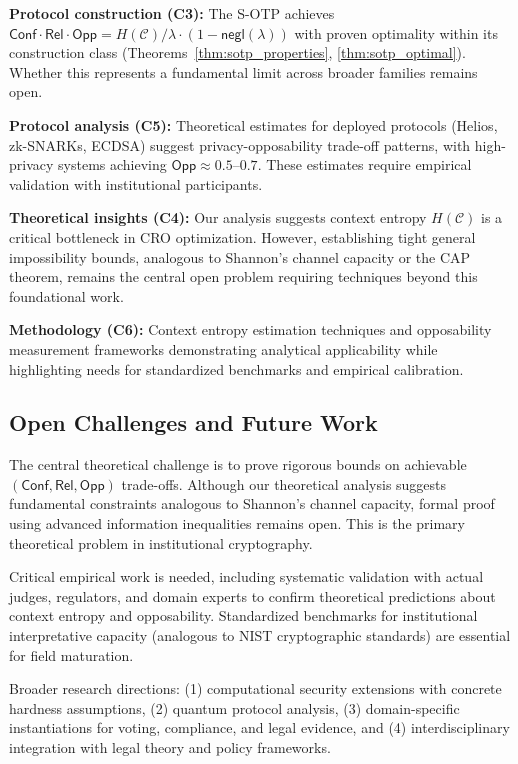 \documentclass{ieeeaccess}
\begin{document}
\textbf{Protocol construction (C3):} The S-OTP achieves $\mathsf{Conf} \cdot \mathsf{Rel} \cdot \mathsf{Opp} = H(\mathcal{C})/\lambda \cdot (1-\mathsf{negl}(\lambda))$ with proven optimality within its construction class (Theorems~\ref{thm:sotp_properties}, \ref{thm:sotp_optimal}). Whether this represents a fundamental limit across broader families remains open.

\textbf{Protocol analysis (C5):} Theoretical estimates for deployed protocols (Helios, zk-SNARKs, ECDSA) suggest privacy-opposability trade-off patterns, with high-privacy systems achieving $\mathsf{Opp} \approx 0.5\text{--}0.7$. These estimates require empirical validation with institutional participants.

\textbf{Theoretical insights (C4):} Our analysis suggests context entropy $H(\mathcal{C})$ is a critical bottleneck in CRO optimization. However, establishing tight general impossibility bounds, analogous to Shannon's channel capacity or the CAP theorem, remains the central open problem requiring techniques beyond this foundational work.

\textbf{Methodology (C6):} Context entropy estimation techniques and opposability measurement frameworks demonstrating analytical applicability while highlighting needs for standardized benchmarks and empirical calibration.

\subsection{Open Challenges and Future Work}

The central theoretical challenge is to prove rigorous bounds on achievable $(\mathsf{Conf}, \mathsf{Rel}, \mathsf{Opp})$ trade-offs. Although our theoretical analysis suggests fundamental constraints analogous to Shannon's channel capacity, formal proof using advanced information inequalities remains open. This is the primary theoretical problem in institutional cryptography.

Critical empirical work is needed, including systematic validation with actual judges, regulators, and domain experts to confirm theoretical predictions about context entropy and opposability. Standardized benchmarks for institutional interpretative capacity (analogous to NIST cryptographic standards) are essential for field maturation.

Broader research directions: (1) computational security extensions with concrete hardness assumptions, (2) quantum protocol analysis, (3) domain-specific instantiations for voting, compliance, and legal evidence, and (4) interdisciplinary integration with legal theory and policy frameworks.
\end{document}
